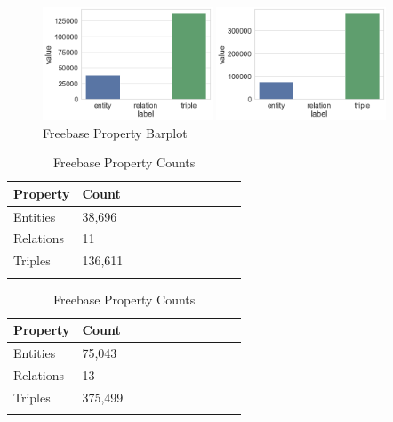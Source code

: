 \bigskip

\begin{figure}[H]
	\parbox{.5\linewidth}{
   		\centering
    		\includegraphics[width=0.45\textwidth]{Wordnet_Counts}
		\caption{Wordnet Property Barplot}
		}
	\hfill
	\parbox{.5\linewidth}{
   		\centering
    		\includegraphics[width=0.45\textwidth]{Freebase_Counts}
		\caption{Freebase Property Barplot}
		}
\end{figure}

\begin{table}[H]
	\parbox{.5\linewidth}{
		\centering
		\begin{tabular}{lllllllllll}
  			\textbf{Property} & \textbf{Count}  \\
  			\hline
  			Entities & 38,696  \\
  			Relations & 11  \\
  			Triples & 136,611  \\
			&
		\end{tabular}
		\caption{Wordnet Property Counts}
		}
	\hfill
	\parbox{.5\linewidth}{
		\centering
		\begin{tabular}{lllllllllll}
  			\textbf{Property} & \textbf{Count}  \\
  			\hline
  			Entities & 75,043   \\
  			Relations & 13  \\
  			Triples & 375,499  \\
			&
		\end{tabular}
		\caption{Freebase Property Counts}
		}
\end{table}


